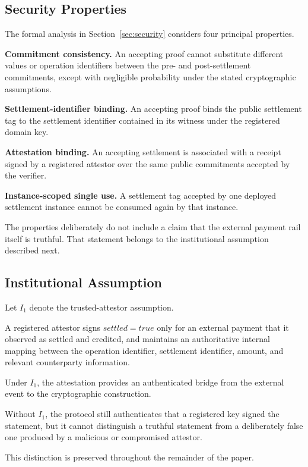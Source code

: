 \documentclass[10pt,twocolumn]{article}
\begin{document}
\subsection{Security Properties}

The formal analysis in Section~\ref{sec:security} considers four
principal properties.

\textbf{Commitment consistency.} An accepting proof cannot substitute
different values or operation identifiers between the pre- and
post-settlement commitments, except with negligible probability under the
stated cryptographic assumptions.

\textbf{Settlement-identifier binding.} An accepting proof binds the
public settlement tag to the settlement identifier contained in its
witness under the registered domain key.

\textbf{Attestation binding.} An accepting settlement is associated with
a receipt signed by a registered attestor over the same public
commitments accepted by the verifier.

\textbf{Instance-scoped single use.} A settlement tag accepted by one
deployed settlement instance cannot be consumed again by that instance.

The properties deliberately do not include a claim that the external
payment rail itself is truthful. That statement belongs to the
institutional assumption described next.

\subsection{Institutional Assumption}

Let $I_1$ denote the trusted-attestor assumption.

A registered attestor signs $\mathit{settled}=\mathit{true}$ only for an
external payment that it observed as settled and credited, and maintains
an authoritative internal mapping between the operation identifier,
settlement identifier, amount, and relevant counterparty information.

Under $I_1$, the attestation provides an authenticated bridge from the
external event to the cryptographic construction.

Without $I_1$, the protocol still authenticates that a registered key
signed the statement, but it cannot distinguish a truthful statement from
a deliberately false one produced by a malicious or compromised attestor.

This distinction is preserved throughout the remainder of the paper.
\end{document}
